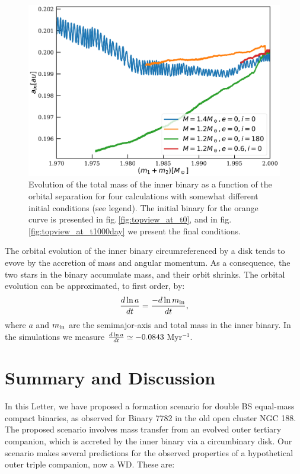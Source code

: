 \documentclass{aastex62}
\begin{document}
\begin{figure}[ht!]
  \includegraphics[width=\columnwidth]{fig_mass_vs_semimajor_axis.pdf}
  \caption{Evolution of the total mass of the inner binary as a
    function of the orbital separation for four calculations with
    somewhat different initial conditions (see legend).  The initial
    binary for the orange curve is presented in
    fig.\,\ref{fig:topview_at_t0}, and in
    fig.\,\ref{fig:topview_at_t1000day} we present the final
    conditions.
\label{fig:mass_vs_semimajor_axis}}
\end{figure}

The orbital evolution of the inner binary circumreferenced by a disk
tends to evove by the accretion of mass and angular momentum. As a
consequence, the two stars in the binary accumulate mass, and their
orbit shrinks. The orbital evolution can be approximated, to first order, by:
\begin{equation}
  {d\ln a \over dt}   = {-d\ln m_{\rm in} \over dt},
\end{equation}
where $a$ and $m_{\rm in}$ are the semimajor-axis and total mass in
the inner binary.  In the simulations we measure ${d\ln a \over dt}
\simeq -0.0843$\,Myr$^{-1}$.


\section{Summary and Discussion} \label{discussion}

In this Letter, we have proposed a formation scenario for double BS equal-mass compact binaries, as observed for Binary 7782 in the old open cluster NGC 188.  The proposed scenario involves mass transfer from an evolved outer tertiary companion, which is accreted by the inner binary via a circumbinary disk.  Our scenario makes several predictions for the observed properties of a hypothetical outer triple companion, now a WD.  These are:
\end{document}
